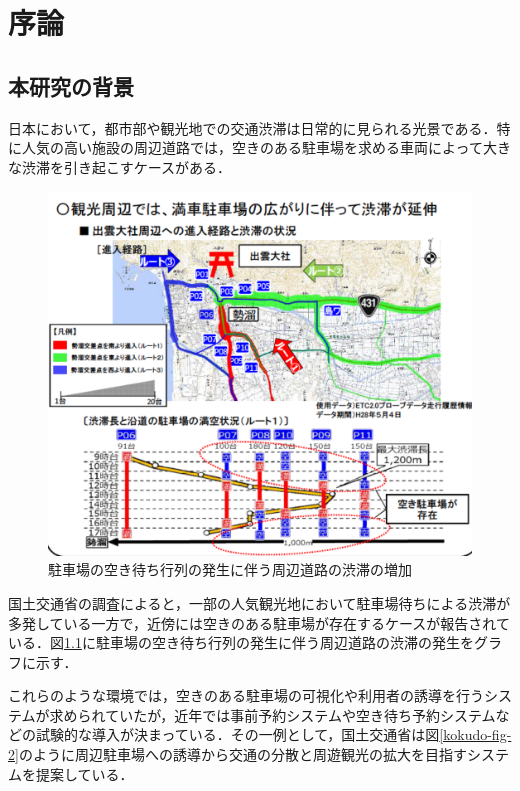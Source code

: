 

\chapter{序論}

\section{本研究の背景}
日本において，都市部や観光地での交通渋滞は日常的に見られる光景である．特に人気の高い施設の周辺道路では，空きのある駐車場を求める車両によって大きな渋滞を引き起こすケースがある．

\begin{figure}[htb]
	\centering
	\includegraphics[width=12cm]{fig/kokudo-fig.png}
	\caption{駐車場の空き待ち行列の発生に伴う周辺道路の渋滞の増加 \protect \footnotemark}
	\label{kokudo-fig}
\end{figure}


国土交通省の調査\cite{Kokudo}によると，一部の人気観光地において駐車場待ちによる渋滞が多発している一方で，近傍には空きのある駐車場が存在するケースが報告されている．図\ref{kokudo-fig}に駐車場の空き待ち行列の発生に伴う周辺道路の渋滞の発生をグラフに示す．

これらのような環境では，空きのある駐車場の可視化や利用者の誘導を行うシステムが求められていたが，近年では事前予約システムや空き待ち予約システムなどの試験的な導入が決まっている．その一例として，国土交通省は図\ref{kokudo-fig-2}のように周辺駐車場への誘導から交通の分散と周遊観光の拡大を目指すシステムを提案している．



